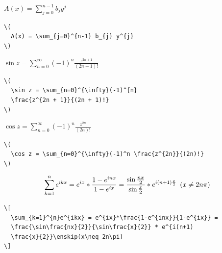 \documentclass[a4paper,10pt,twoside]{scrbook}
\begin{document}
{\begin{minipage}[c]{.38\textwidth}
\setlength{\parskip}{1em}
\centering
\(
  A(x) = \sum_{j=0}^{n-1} b_{j} y^{j}
\)
\end{minipage}
\hfill
\begin{minipage}[c]{.6\textwidth}
\setlength{\parskip}{1em}
\begin{lstlisting}[label=formelbeispiel4, style=customlatex]
\(
  A(x) = \sum_{j=0}^{n-1} b_{j} y^{j}
\)
\end{lstlisting}
\end{minipage}


\begin{minipage}[c]{.38\textwidth}
\setlength{\parskip}{1em}
\centering
\(
  \sin z = \sum_{n=0}^{\infty}(-1)^{n}
  \frac{z^{2n + 1}}{(2n + 1)!} 
\)
\end{minipage}
\hfill
\begin{minipage}[c]{.6\textwidth}
\setlength{\parskip}{1em}
\begin{lstlisting}[label=formelbeispiel5, style=customlatex]
\(
  \sin z = \sum_{n=0}^{\infty}(-1)^{n}
  \frac{z^{2n + 1}}{(2n + 1)!}  
\)
\end{lstlisting}
\end{minipage}


\begin{minipage}[c]{.38\textwidth}
\setlength{\parskip}{1em}
\centering
\(
  \cos z = \sum_{n=0}^{\infty}(-1)^n \frac{z^{2n}}{(2n)!} 
\)
\end{minipage}
\hfill
\begin{minipage}[c]{.6\textwidth}
\setlength{\parskip}{1em}
\begin{lstlisting}[label=formelbeispiel6, style=customlatex]
\(
  \cos z = \sum_{n=0}^{\infty}(-1)^n \frac{z^{2n}}{(2n)!} 
\)
\end{lstlisting}
\end{minipage}


\[
  \sum_{k=1}^{n}e^{ikx} = e^{ix}*\frac{1-e^{inx}}{1-e^{ix}} =
  \frac{\sin\frac{nx}{2}}{\sin\frac{x}{2}} * e^{i(n+1)
  \frac{x}{2}}\enskip(x\neq 2n\pi)
\]


\begin{lstlisting}[label=formelbeispiel7, style=customlatex]
\[
  \sum_{k=1}^{n}e^{ikx} = e^{ix}*\frac{1-e^{inx}}{1-e^{ix}} =
  \frac{\sin\frac{nx}{2}}{\sin\frac{x}{2}} * e^{i(n+1)
  \frac{x}{2}}\enskip(x\neq 2n\pi)
\]
\end{lstlisting}






}
\end{document}
